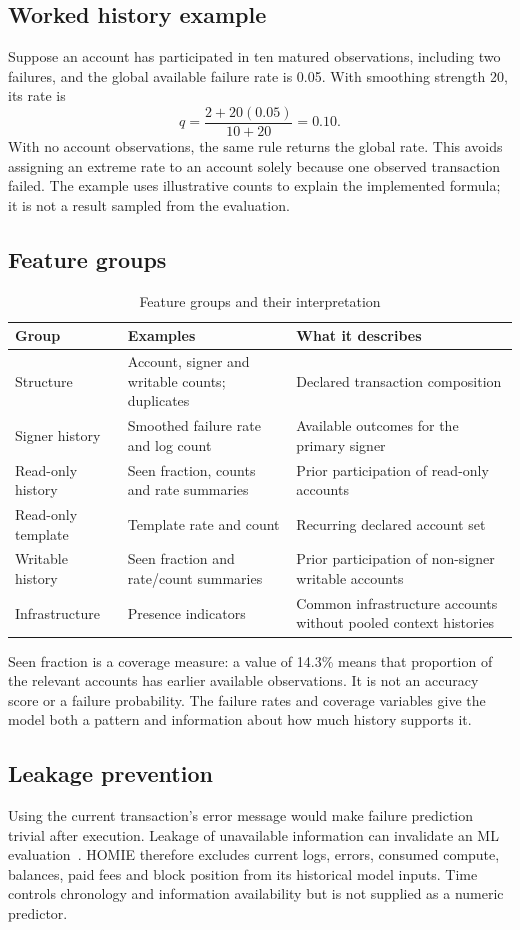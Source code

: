 \documentclass[12pt,a4paper,oneside]{report}
\begin{document}
\subsection{Worked history example}
Suppose an account has participated in ten matured observations, including two failures, and the global available failure rate is 0.05. With smoothing strength 20, its rate is
\begin{equation}q=\frac{2+20(0.05)}{10+20}=0.10.\end{equation}
With no account observations, the same rule returns the global rate. This avoids assigning an extreme rate to an account solely because one observed transaction failed. The example uses illustrative counts to explain the implemented formula; it is not a result sampled from the evaluation.
\subsection{Feature groups}
\begin{table}[htbp]\centering\caption{Feature groups and their interpretation}
\small\begin{tabularx}{\textwidth}{p{29mm}YY}\toprule Group&Examples&What it describes\\\midrule
Structure&Account, signer and writable counts; duplicates&Declared transaction composition\\
Signer history&Smoothed failure rate and log count&Available outcomes for the primary signer\\
Read-only history&Seen fraction, counts and rate summaries&Prior participation of read-only accounts\\
Read-only template&Template rate and count&Recurring declared account set\\
Writable history&Seen fraction and rate/count summaries&Prior participation of non-signer writable accounts\\
Infrastructure&Presence indicators&Common infrastructure accounts without pooled context histories\\\bottomrule\end{tabularx}\end{table}
Seen fraction is a coverage measure: a value of 14.3\% means that proportion of the relevant accounts has earlier available observations. It is not an accuracy score or a failure probability. The failure rates and coverage variables give the model both a pattern and information about how much history supports it.
\subsection{Leakage prevention}
Using the current transaction's error message would make failure prediction trivial after execution. Leakage of unavailable information can invalidate an ML evaluation~\cite{leakage}. HOMIE therefore excludes current logs, errors, consumed compute, balances, paid fees and block position from its historical model inputs. Time controls chronology and information availability but is not supplied as a numeric predictor.
\end{document}
